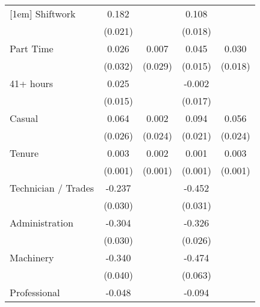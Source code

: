 {\begin{tabular}{l*{4}{c}}
[1em]
Shiftwork           &       0.182\sym{***}&                     &       0.108\sym{***}&                     \\
                    &     (0.021)         &                     &     (0.018)         &                     \\
[1em]
Part Time           &       0.026         &       0.007         &       0.045\sym{**} &       0.030         \\
                    &     (0.032)         &     (0.029)         &     (0.015)         &     (0.018)         \\
[1em]
41+ hours           &       0.025         &                     &      -0.002         &                     \\
                    &     (0.015)         &                     &     (0.017)         &                     \\
[1em]
Casual              &       0.064\sym{*}  &       0.002         &       0.094\sym{***}&       0.056\sym{*}  \\
                    &     (0.026)         &     (0.024)         &     (0.021)         &     (0.024)         \\
[1em]
Tenure              &       0.003\sym{*}  &       0.002\sym{*}  &       0.001         &       0.003\sym{**} \\
                    &     (0.001)         &     (0.001)         &     (0.001)         &     (0.001)         \\
[1em]
Technician / Trades &      -0.237\sym{***}&                     &      -0.452\sym{***}&                     \\
                    &     (0.030)         &                     &     (0.031)         &                     \\
[1em]
Administration      &      -0.304\sym{***}&                     &      -0.326\sym{***}&                     \\
                    &     (0.030)         &                     &     (0.026)         &                     \\
[1em]
Machinery           &      -0.340\sym{***}&                     &      -0.474\sym{***}&                     \\
                    &     (0.040)         &                     &     (0.063)         &                     \\
[1em]
Professional        &      -0.048         &                     &      -0.094\sym{***}&                     \\

\end{tabular}}
